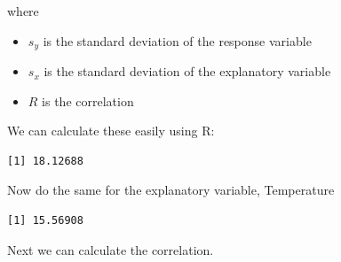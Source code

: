 \documentclass[
  letterpaper,
  DIV=11,
  numbers=noendperiod]{scrreprt}
\newenvironment{Shaded}{\begin{snugshade}}{\end{snugshade}}
\newcommand{\CommentTok}[1]{\textcolor[rgb]{0.37,0.37,0.37}{#1}}
\newcommand{\FunctionTok}[1]{\textcolor[rgb]{0.28,0.35,0.67}{#1}}
\newcommand{\NormalTok}[1]{\textcolor[rgb]{0.00,0.23,0.31}{#1}}
\newcommand{\OtherTok}[1]{\textcolor[rgb]{0.00,0.23,0.31}{#1}}
\newcommand{\SpecialCharTok}[1]{\textcolor[rgb]{0.37,0.37,0.37}{#1}}
\providecommand{\tightlist}{%
  \setlength{\itemsep}{0pt}\setlength{\parskip}{0pt}}\usepackage{longtable,booktabs,array}
\begin{document}
where

\begin{itemize}
\tightlist
\item
  \(s_y\) is the standard deviation of the response variable
\item
  \(s_x\) is the standard deviation of the explanatory variable
\item
  \(R\) is the correlation
\end{itemize}

We can calculate these easily using R:

\begin{Shaded}
\end{Shaded}

\begin{verbatim}
[1] 18.12688
\end{verbatim}

Now do the same for the explanatory variable, Temperature

\begin{Shaded}
\end{Shaded}

\begin{verbatim}
[1] 15.56908
\end{verbatim}

Next we can calculate the correlation.

\begin{Shaded}
\end{Shaded}
\end{document}
